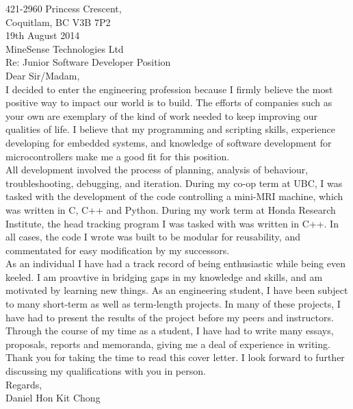 \documentclass[10pt,a4paper]{article}
\begin{document}
\flushleft
\large
421-2960 Princess Crescent,\\
Coquitlam, BC V3B 7P2 \\
\medskip
19th August 2014 \\
\medskip
MineSense Technologies Ltd\\
\medskip
Re: Junior Software Developer Position\\
\medskip
Dear Sir/Madam,\\

\medskip
\hspace{10mm}
I decided to enter the engineering profession because I firmly believe the most positive way to impact our world is to build.
The efforts of companies such as your own are exemplary of the kind of work needed to keep improving our qualities of life.
I believe that my programming and scripting skills, experience developing for embedded systems, and knowledge of software development for 
microcontrollers make me a good fit for this position.
\\
\medskip
\hspace{10mm}
All development involved the process of planning, analysis of behaviour, troubleshooting, debugging, and iteration.
During my co-op term at UBC, I was tasked with the development of the code controlling a mini-MRI machine, which was written in C, C++ and Python.
During my work term at Honda Research Institute, the head tracking program I was tasked with was written in C++.
In all cases, the code I wrote was built to be modular for reusability, and commentated for easy modification by my successors.
\\
\medskip
\hspace{10mm}
As an individual I have had a track record of being enthusiastic while being even keeled. 
I am proavtive in bridging gaps in my knowledge and skills, and am motivated by learning new things.
As an engineering student, I have been subject to many short-term as well as term-length projects.
In many of these projects, I have had to present the results of the project before my peers and instructors.
Through the course of my time as a student, I have had to write many essays, proposals, reports and memoranda, giving me a deal of experience in writing.
Thank you for taking the time to read this cover letter.
I look forward to further discussing my qualifications with you in person.
\\

\bigskip
Regards, \\
Daniel Hon Kit Chong
\end{document}
